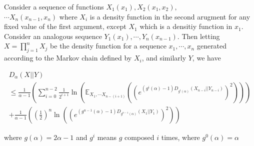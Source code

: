\begin{theorem}
\label{thm:composition}

    Consider a sequence of functions $X_1(x_1), X_2(x_1,x_2),$ \\ $ \cdots X_n(x_{n-1},x_n)$ where $X_{i}$ is a density function in the second arugment for any fixed value of the first argument, except $X_1$ which is a densitiy function in $x_1$. Consider an analogous sequence $Y_1(x_1),\cdots, Y_n(x_{n-1})$. Then letting $X = \prod_{j=1}^{n} X_j$ be the density function for a sequence $x_1,\cdots,x_n$ generated according to the Markov chain defined by $X_i$, and similarly $Y$, we have
    


    \begin{multline}
        D_{\alpha}(X || Y) \\ \leq \frac{1}{\alpha -1} (\sum_{i=0}^{n-2} \frac{1}{2^{i+1}} \ln (\mathbb{E}_{X_1,\cdots X_{n-(i+1)}}  ((e^{(g^{i}(\alpha) -1)D_{g^{i}(\alpha)}(X_{n-i}|| Y_{n-i})})^2))) \\ + \frac{1}{\alpha -1} ((\frac{1}{2})^{n} \ln ((e^{(g^{n-1}(\alpha) -1)D_{g^{n-1}(\alpha)}(X_{1}|| Y_{1})})^2)) 
    \end{multline}
    

    where $g(\alpha) = 2\alpha -1$ and $g^i$ means $g$ composed $i$ times, where $g^{0}(\alpha) = \alpha$
\end{theorem}

